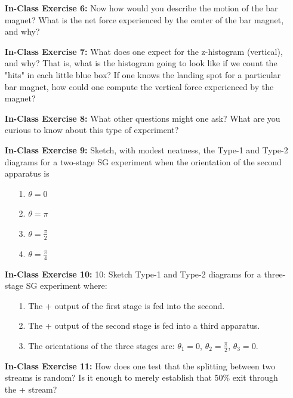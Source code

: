 \documentclass[main.tex]{subfiles}
\begin{document}
\begin{enumerate}
\item[] \textbf{In-Class Exercise 6:} Now how would you describe the motion of the bar magnet? What is the net force experienced by the center of the bar magnet, and why?

\item[] \textbf{In-Class Exercise 7:} What does one expect for the z-histogram (vertical), and why? That is, what is the histogram going to look like if we count the "hits" in each little blue box? If one knows the landing spot for a particular bar magnet, how could one compute the vertical force experienced by the magnet?

\item[] \textbf{In-Class Exercise 8:} What other questions might one ask? What are you curious to know about this type of experiment?

\item[] \textbf{In-Class Exercise 9:} Sketch, with modest neatness, the Type-1 and Type-2 diagrams for a two-stage SG experiment when the orientation of the second apparatus is

    \begin{enumerate}
        \item[1.] $\theta=0$
        \item[2.] $\theta=\pi$
        \item[3.] $\theta=\frac{\pi}{2}$
        \item[4.] $\theta=\frac{\pi}{4}$
    \end{enumerate}

\item[] \textbf{In-Class Exercise 10:} 10: Sketch Type-1 and Type-2 diagrams for a three-stage SG experiment where:

    \begin{enumerate}
        \item[1.] The + output of the first stage is fed into the second.
        \item[2.] The + output of the second stage is fed into a third apparatus.
        \item[3.] The orientations of the three stages are: $\theta_{1}=0$, $\theta_{2}=\frac{\pi}{2}$, $\theta_{3}=0$.
    \end{enumerate}

\item[] \textbf{In-Class Exercise 11:} How does one test that the splitting between two streams is random? Is it enough to merely establish that 50\% exit through the + stream?


\end{enumerate}
\end{document}
